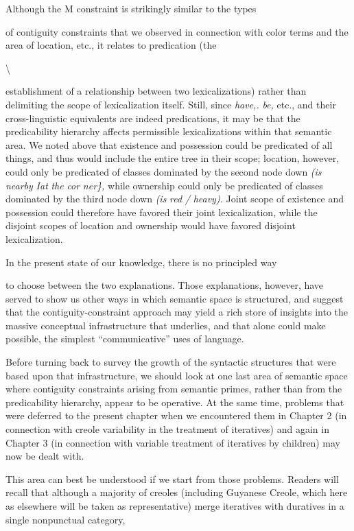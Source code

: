 Although the M constraint is strikingly similar to the types

of contiguity constraints that we observed in connection with color terms and the area of location, etc., it relates to predication (the

{\textbackslash}


establishment of a relationship between two lexicalizations) rather than delimiting the scope of lexicalization itself. Still, since \textit{have,.} \textit{be,} etc., and their cross-linguistic equivalents are indeed predications, it may be that the predicability hierarchy affects permissible lexicalizations within that semantic area. We noted above that existence and posses\-sion could be predicated of all things, and thus would include the entire tree in their scope; location, however, could only be predicated of classes dominated by the second node down \textit{(is} \textit{nearby} \textit{I}\textit{at} \textit{the} \textit{cor\-} \textit{ner\},} while ownership could only be predicated of classes dominated by the third node down \textit{(is} \textit{red} \textit{/} \textit{heavy).} Joint scope of existence and possession could therefore have favored their joint lexicalization, while the disjoint scopes of location and ownership would have favored disjoint lexicalization.

In the present state of our knowledge, there is no principled way

to choose between the two explanations. Those explanations, however, have served to show us other ways in which semantic space is struc\-tured, and suggest that the contiguity-constraint approach may yield a rich store of insights into the massive conceptual infrastructure that underlies, and that alone could make possible, the simplest ``communi\-cative'' uses of language.

Before turning back to survey the growth of the syntactic struc\-tures that were based upon that infrastructure, we should look at one last area of semantic space where contiguity constraints arising from semantic primes, rather than from the predicability hierarchy, appear to be operative. At the same time, problems that were deferred to the present chapter when we encountered them in Chapter 2 (in connection with creole variability in the treatment of iteratives) and again in Chapter 3 (in connection with variable treatment of iteratives by children) may now be dealt with.

This area can best be understood if we start from those problems. Readers will recall that although a majority of creoles (including Guyanese Creole, which here as elsewhere will be taken as representa\-tive) merge iteratives with duratives in a single nonpunctual category,

